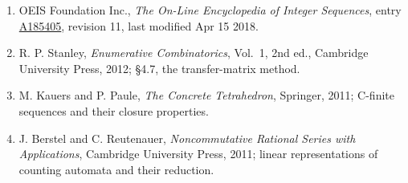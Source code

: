\documentclass[11pt]{article}
\theoremstyle{definition}
\begin{document}
\begin{enumerate}

\item OEIS Foundation Inc., \emph{The On-Line Encyclopedia of Integer Sequences}, entry \href{https://oeis.org/A185405}{A185405}, revision 11, last modified Apr 15 2018.

\item R. P. Stanley, \emph{Enumerative Combinatorics}, Vol.~1, 2nd ed., Cambridge University Press, 2012; \S4.7, the transfer-matrix method.

\item M. Kauers and P. Paule, \emph{The Concrete Tetrahedron}, Springer, 2011; C-finite sequences and their closure properties.

\item J. Berstel and C. Reutenauer, \emph{Noncommutative Rational Series with Applications}, Cambridge University Press, 2011; linear representations of counting automata and their reduction.

\end{enumerate}
\end{document}
